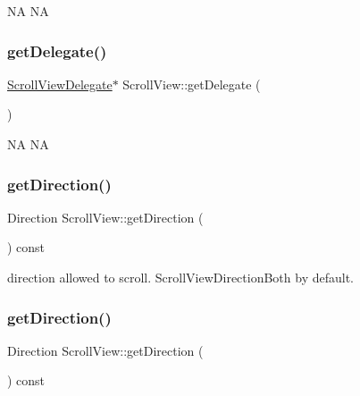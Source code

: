 NA  NA \mbox{\label{classScrollView_a49b7e183c04e572d20f20ac4d8a6d3c6}} 
\subsubsection{\texorpdfstring{get\+Delegate()}{getDelegate()}\hspace{0.1cm}{\footnotesize\ttfamily [2/2]}}
{\footnotesize\ttfamily \hyperlink{classScrollViewDelegate}{Scroll\+View\+Delegate}$\ast$ Scroll\+View\+::get\+Delegate (\begin{DoxyParamCaption}{ }\end{DoxyParamCaption})\hspace{0.3cm}{\ttfamily [inline]}}

NA  NA \mbox{\label{classScrollView_a29b46de3ff7003160ddb9b51f38e64c1}} 
\subsubsection{\texorpdfstring{get\+Direction()}{getDirection()}\hspace{0.1cm}{\footnotesize\ttfamily [1/2]}}
{\footnotesize\ttfamily Direction Scroll\+View\+::get\+Direction (\begin{DoxyParamCaption}{ }\end{DoxyParamCaption}) const\hspace{0.3cm}{\ttfamily [inline]}}

direction allowed to scroll. Scroll\+View\+Direction\+Both by default. \mbox{\label{classScrollView_a29b46de3ff7003160ddb9b51f38e64c1}} 
\subsubsection{\texorpdfstring{get\+Direction()}{getDirection()}\hspace{0.1cm}{\footnotesize\ttfamily [2/2]}}
{\footnotesize\ttfamily Direction Scroll\+View\+::get\+Direction (\begin{DoxyParamCaption}{ }\end{DoxyParamCaption}) const\hspace{0.3cm}{\ttfamily [inline]}}

